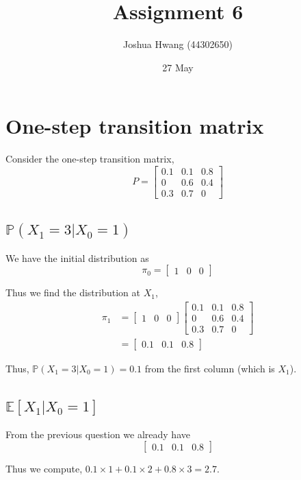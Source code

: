 \documentclass{article}
\title{Assignment 6}
\author{Joshua Hwang (44302650)}
\date{27 May}
\newcommand{\prob}{\mathbb{P}}
\newcommand{\expect}{\mathbb{E}}
\begin{document}
\maketitle

\section{One-step transition matrix}
Consider the one-step transition matrix,
\[
    P =
    \begin{bmatrix}
        0.1 & 0.1 & 0.8 \\
          0 & 0.6 & 0.4 \\
        0.3 & 0.7 &   0
    \end{bmatrix}
\]

\subsection{$\prob(X_1 = 3 | X_0 = 1)$}
We have the initial distribution as
\[
    \pi_0 =
    \begin{bmatrix}
        1 & 0 & 0
    \end{bmatrix}
\]

Thus we find the distribution at $X_1$,
\begin{align*}
    \pi_1
    &=
    \begin{bmatrix}
        1 & 0 & 0
    \end{bmatrix}
    \begin{bmatrix}
        0.1 & 0.1 & 0.8 \\
          0 & 0.6 & 0.4 \\
        0.3 & 0.7 &   0
    \end{bmatrix} \\
    &=
    \begin{bmatrix}
        0.1 & 0.1 & 0.8
    \end{bmatrix}
\end{align*}

Thus, $\prob(X_1 = 3 | X_0 = 1) = 0.1$ from the first column (which is $X_1$).

\subsection{$\expect[X_1 | X_0 = 1]$}
From the previous question we already have
\[
    \begin{bmatrix}
        0.1 & 0.1 & 0.8
    \end{bmatrix}
\]

Thus we compute, $0.1 \times 1 + 0.1 \times 2 + 0.8 \times 3 = 2.7$.
\end{document}
